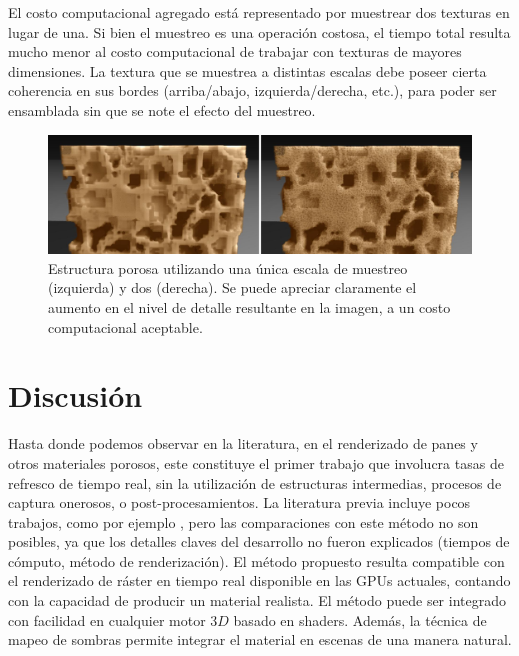 El costo computacional agregado está representado por muestrear dos texturas en lugar de una.
Si bien el muestreo es una operación costosa, el tiempo total resulta mucho menor al costo computacional de trabajar con texturas de mayores dimensiones.
La textura que se muestrea a distintas escalas debe poseer cierta coherencia en sus bordes (arriba/abajo, izquierda/derecha, etc.), para poder ser ensamblada sin que se note el efecto del muestreo.

\begin{figure}
  \centerline{\includegraphics[width=12cm]{figures/multiscale}}
  \caption[Estructura porosa utilizando una y dos escala de muestreo]{Estructura porosa utilizando una única escala de muestreo (izquierda) y dos (derecha). Se puede apreciar claramente el aumento en el nivel de detalle resultante en la imagen, a un costo computacional aceptable.}
  \label{fg:multiscale}
\end{figure}

\section{Discusión}

Hasta donde podemos observar en la literatura, en el renderizado de panes y otros materiales porosos, este constituye el primer trabajo que involucra tasas de refresco de tiempo real, sin la utilización de estructuras intermedias, procesos de captura onerosos, o post-procesamientos.
La literatura previa incluye pocos trabajos, como por ejemplo \cite{Cho2007}, pero las comparaciones con este método no son posibles, ya que los detalles claves del desarrollo no fueron explicados (tiempos de cómputo, método de renderización).
El método propuesto resulta compatible con el renderizado de ráster en tiempo real disponible en las GPUs actuales, contando con la capacidad de producir un material realista.
El método puede ser integrado con facilidad en cualquier motor $3D$ basado en shaders.
Además, la técnica de mapeo de sombras permite integrar el material en escenas de una manera natural.


